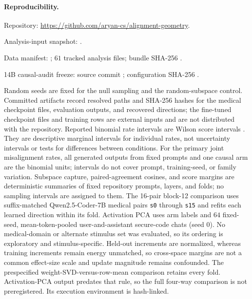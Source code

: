 \paragraph{Reproducibility.}
\begingroup\small\raggedright
Repository: \url{https://github.com/aryan-cs/alignment-geometry}.\par
Analysis-input snapshot: .\par
Data manifest: ; $61$ tracked analysis
files; bundle SHA-256
.\par
14B causal-audit freeze: source commit
; configuration SHA-256
.\par
\endgroup
Random seeds are fixed for the null sampling
and the random-subspace control. Committed artifacts record resolved paths and
SHA-256 hashes for the medical checkpoint files, evaluation outputs, and
recovered directions; the fine-tuned checkpoint files and training rows are
external inputs and are not distributed with the repository.
Reported binomial rate intervals are Wilson
score intervals \citep{wilson1927}. They are descriptive marginal intervals for
individual rates, not uncertainty intervals or tests for differences between
conditions. For the primary joint misalignment rates, all generated outputs from
fixed prompts and one causal arm are the binomial units;
intervals do not cover prompt, training-seed, or family variation. Subspace
capture, paired-agreement cosines, and score margins are deterministic summaries
of fixed repository prompts, layers, and folds; no sampling intervals are
assigned to them. The 16-pair block-12 comparison uses suffix-matched
Qwen2.5-Coder-7B medical pairs \texttt{s0} through \texttt{s15} and refits each
learned direction within its fold. Activation PCA uses arm labels and $64$
fixed-seed, mean-token-pooled user-and-assistant secure-code chats (seed $0$).
No medical-domain or alternate stimulus set was evaluated, so its ordering is
exploratory and stimulus-specific. Held-out increments are normalized, whereas training increments remain
energy unmatched, so cross-space margins are not a common effect-size scale and
update magnitude remains confounded. The prespecified weight-SVD-versus-row-mean
comparison retains every fold. Activation-PCA output predates that rule, so the
full four-way comparison is not preregistered. Its execution environment is
hash-linked.

